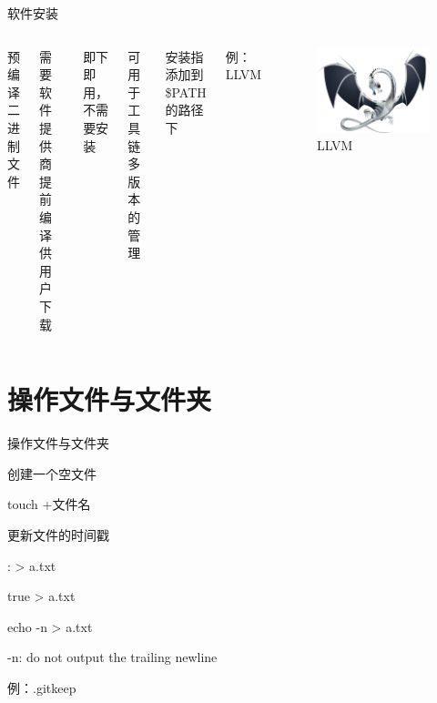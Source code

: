 \documentclass[UTF8]{ctexbeamer}
\begin{document}
\begin{frame}{软件安装}

    \begin{columns}
    

    预编译二进制文件

    需要软件提供商提前编译供用户下载

    即下即用，不需要安装

    可用于工具链多版本的管理

    安装指添加到 \$PATH 的路径下

    例：LLVM
    
    
    \begin{figure}
        \centering
        \includegraphics[width=\textwidth]{llvm-logo.png}
        \caption{LLVM}
        \label{fig:llvm}
    \end{figure}
    
    \end{columns}

\end{frame}

\section{操作文件与文件夹}

\begin{frame}{操作文件与文件夹}

    创建一个空文件

    touch +文件名

    更新文件的时间戳

    : > a.txt

    true > a.txt

    echo -n > a.txt

    -n: do not output the trailing newline

    例：.gitkeep
    
\end{frame}
\end{document}
